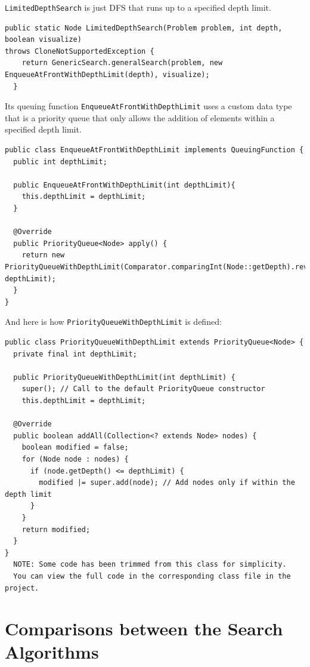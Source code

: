 \documentclass{article}
\begin{document}
\texttt{LimitedDepthSearch} is just DFS that runs up to a specified depth limit. 

\begin{verbatim}
public static Node LimitedDepthSearch(Problem problem, int depth, boolean visualize) 
throws CloneNotSupportedException {
    return GenericSearch.generalSearch(problem, new EnqueueAtFrontWithDepthLimit(depth), visualize);
  }
\end{verbatim}

Its queuing function \texttt{EnqueueAtFrontWithDepthLimit} uses a custom data type that is a priority queue that only allows the addition of elements within a specified depth limit.

\newpage

\begin{verbatim}
public class EnqueueAtFrontWithDepthLimit implements QueuingFunction {
  public int depthLimit;

  public EnqueueAtFrontWithDepthLimit(int depthLimit){
    this.depthLimit = depthLimit;
  }

  @Override
  public PriorityQueue<Node> apply() {
    return new PriorityQueueWithDepthLimit(Comparator.comparingInt(Node::getDepth).reversed(), depthLimit);
  }
}

\end{verbatim}

And here is how \texttt{PriorityQueueWithDepthLimit} is defined:

\begin{verbatim}
public class PriorityQueueWithDepthLimit extends PriorityQueue<Node> {
  private final int depthLimit;

  public PriorityQueueWithDepthLimit(int depthLimit) {
    super(); // Call to the default PriorityQueue constructor
    this.depthLimit = depthLimit;

  @Override
  public boolean addAll(Collection<? extends Node> nodes) {
    boolean modified = false;
    for (Node node : nodes) {
      if (node.getDepth() <= depthLimit) {
        modified |= super.add(node); // Add nodes only if within the depth limit
      }
    }
    return modified;
  }
}
  NOTE: Some code has been trimmed from this class for simplicity. 
  You can view the full code in the corresponding class file in the project.
\end{verbatim}

\section{Comparisons between the Search Algorithms}
\end{document}
